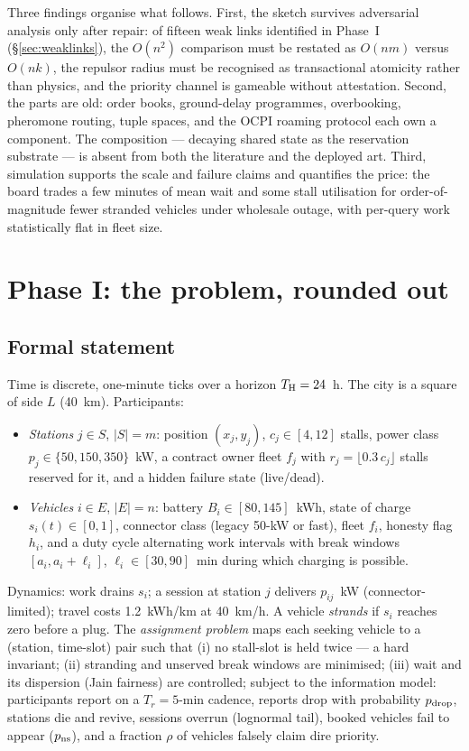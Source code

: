 \documentclass[twoside,twocolumn,usenatbib]{mnras}
\begin{document}
Three findings organise what follows.  First, the sketch survives
adversarial analysis only after repair: of fifteen weak links
identified in Phase~I (\S\ref{sec:weaklinks}), the $O(n^2)$
comparison must be restated as $O(nm)$ versus $O(nk)$, the repulsor
radius must be recognised as transactional atomicity rather than
physics, and the priority channel is gameable without attestation.
Second, the parts are old: order books,
ground-delay programmes, overbooking, pheromone routing, tuple
spaces, and the OCPI roaming protocol each own a component.  The
composition --- decaying shared state as the reservation substrate ---
is absent from both the literature and the deployed art.  Third,
simulation supports the scale and failure claims and quantifies the
price: the board trades a few minutes of mean wait and some stall
utilisation for order-of-magnitude fewer stranded vehicles under
wholesale outage, with per-query work statistically flat in fleet
size.

\section{Phase I: the problem, rounded out}

\label{sec:phase1}

\subsection{Formal statement}

Time is discrete, one-minute ticks over a horizon $T_{\rm H}=24$~h.
The city is a square of side $L$ (40~km).  Participants:

\begin{itemize}
\item \emph{Stations} $j\in S$, $|S|=m$: position $(x_j,y_j)$, $c_j\in[4,12]$
stalls, power class $p_j\in\{50,150,350\}$~kW, a contract owner fleet
$f_j$ with $r_j=\lfloor0.3\,c_j\rfloor$ stalls reserved for it, and a
hidden failure state (live/dead).
\item \emph{Vehicles} $i\in E$, $|E|=n$: battery $B_i\in[80,145]$~kWh,
state of charge $s_i(t)\in[0,1]$, connector class (legacy 50-kW or
fast), fleet $f_i$, honesty flag $h_i$, and a duty cycle alternating
work intervals with break windows $[a_i, a_i+\ell_i]$,
$\ell_i\in[30,90]$~min during which charging is possible.
\end{itemize}

Dynamics: work drains $s_i$; a session at station $j$ delivers
$p_{ij}$~kW (connector-limited); travel costs 1.2~kWh/km at 40~km/h.
A vehicle \emph{strands} if $s_i$ reaches zero before a plug.  The
\emph{assignment problem} maps each seeking vehicle to a
(station, time-slot) pair such that (i) no stall-slot is held twice
--- a hard invariant; (ii) stranding and unserved break windows are
minimised; (iii) wait and its dispersion (Jain fairness) are
controlled; subject to the information model: participants report on
a $T_r=5$-min cadence, reports drop with probability $p_{\rm drop}$,
stations die and revive, sessions overrun (lognormal tail), booked
vehicles fail to appear ($p_{\rm ns}$), and a fraction $\rho$ of
vehicles falsely claim dire priority.
\end{document}
